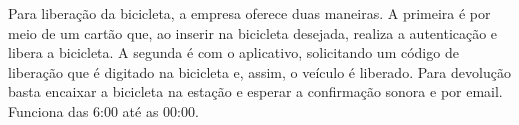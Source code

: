 Para liberação da bicicleta, a empresa oferece duas maneiras. A primeira é por meio de um cartão que, ao inserir na bicicleta desejada, realiza a autenticação e libera a bicicleta. A segunda é com o aplicativo, solicitando um código de liberação que é digitado na bicicleta e, assim, o veículo é liberado. Para devolução basta encaixar a bicicleta na estação e esperar a confirmação sonora e por email. Funciona das 6:00 até as 00:00.
